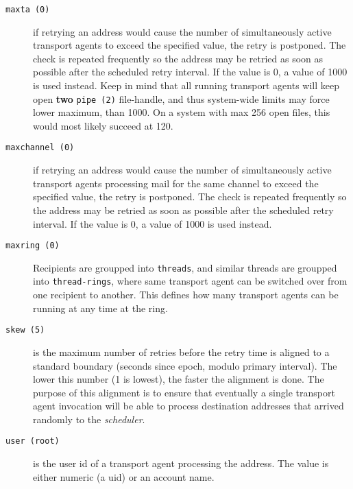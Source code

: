 \begin{description}
\item[{\tt maxta (0)}] \mbox{}

if retrying an address would cause the number of 
simultaneously active transport agents to exceed the specified value, 
the retry is postponed. The check is repeated frequently so the address 
may be retried as soon as possible after the scheduled retry interval. 
If the value is 0, a value of 1000 is used instead. Keep in mind that all 
running transport agents will keep open {\bf two} {\tt pipe (2)} 
file-handle, and thus system-wide limits may force lower maximum, than 1000.
On a system with max 256 open files, this would most likely succeed at 120.



\item[{\tt maxchannel (0)}] \mbox{}

if retrying an address would cause the number of simultaneously active
transport agents processing mail for the same channel to exceed
the specified value, the retry is postponed.
The check is repeated frequently so the address may be retried as soon
as possible after the scheduled retry interval. If the value is 0,
a value of 1000 is used instead.



\item[{\tt maxring (0)}] \mbox{}

Recipients are groupped into {\tt threads}, 
and similar threads are groupped into {\tt thread-rings}, where same 
transport agent can be switched over from one recipient to another. This 
defines how many transport agents can be running at any time at the ring.



\item[{\tt skew (5)}] \mbox{}

is the maximum number of retries before the retry 
time is aligned to a standard boundary (seconds since epoch, modulo primary 
interval). The lower this number (1 is lowest), the faster the alignment is 
done. The purpose of this alignment is to ensure that eventually a single 
transport agent invocation will be able to process destination addresses 
that arrived randomly to the {\em scheduler\/}.



\item[{\tt user (root)}] \mbox{}

is the user id of a transport agent processing 
the address. The value is either numeric (a uid) or an account name.




\end{description}
